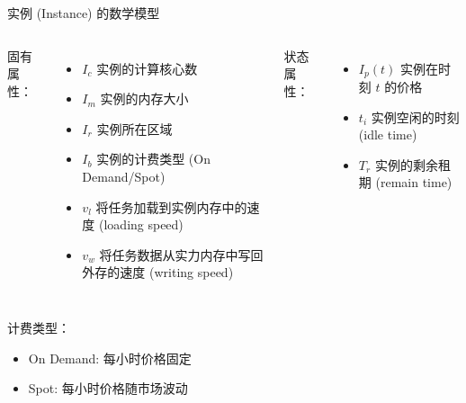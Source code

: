 \begin{frame}{实例 (Instance) 的数学模型}

    \begin{columns}


        固有属性：

        \begin{itemize}
            \item $I_c$ 实例的计算核心数
            \item $I_m$ 实例的内存大小
            \item $I_r$ 实例所在区域
            \item $I_b$ 实例的计费类型 (On Demand/Spot)
            \item $v_l$ 将任务加载到实例内存中的速度 (loading speed)
            \item $v_w$ 将任务数据从实力内存中写回外存的速度 (writing speed)
        \end{itemize}


        状态属性：

        \begin{itemize}
            \item $I_p(t)$ 实例在时刻 $t$ 的价格
            \item $t_i$ 实例空闲的时刻 (idle time)
            \item $T_r$ 实例的剩余租期 (remain time)
        \end{itemize}

    \end{columns}

    \vspace{1em}

    计费类型：

    \begin{itemize}
        \item On Demand: 每小时价格固定
        \item Spot: 每小时价格随市场波动
    \end{itemize}

\end{frame}
